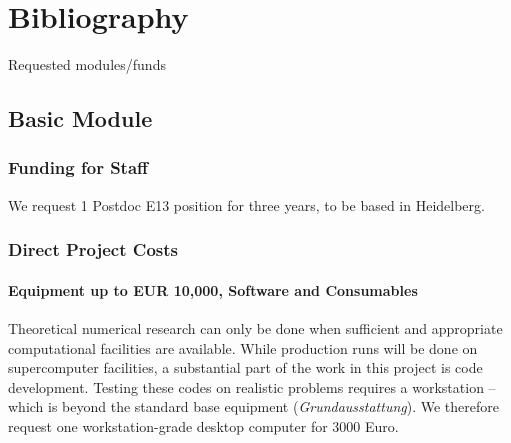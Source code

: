 \documentclass[10pt,fleqn,twoside]{article}
\begin{document}
\section{Bibliography}

\begingroup
\renewcommand{\section}[2]{}%


\endgroup


\section{Requested modules/funds}
\renewcommand{\leftmark}{\sc Requested modules/funds}
%
\subsection{Basic Module}
%
\subsubsection{Funding for Staff}
%
We request 1 Postdoc E13 position for three years, to be based in Heidelberg.

\subsubsection{Direct Project Costs}

\paragraph{Equipment up to EUR 10,000, Software and Consumables}
Theoretical numerical research can only be done when sufficient and
appropriate computational facilities are available. While production runs
will be done on supercomputer facilities, a substantial part of the work in
this project is code development. Testing these codes on realistic problems
requires a workstation -- which is beyond the standard base equipment
(\textit{Grundausstattung}). We therefore request one workstation-grade
desktop computer for 3000 Euro.
\end{document}
